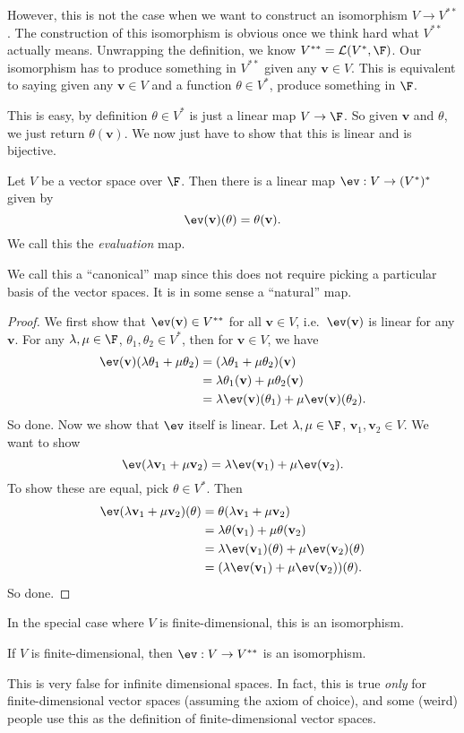 \documentclass[a4paper]{article}
\begin{document}
However, this is not the case when we want to construct an isomorphism $V \to V^{**}$. The construction of this isomorphism is obvious once we think hard what $V^{**}$ actually means. Unwrapping the definition, we know $V^{**} = \mathcal{L}(V^*, \F)$. Our isomorphism has to produce something in $V^{**}$ given any $\mathbf{v} \in V$. This is equivalent to saying given any $\mathbf{v} \in V$ and a function $\theta \in V^*$, produce something in $\F$.

This is easy, by definition $\theta \in V^*$ is just a linear map $V \to \F$. So given $\mathbf{v}$ and $\theta$, we just return $\theta(\mathbf{v})$. We now just have to show that this is linear and is bijective.
\begin{lemma}
  Let $V$ be a vector space over $\F$. Then there is a linear map $\ev: V\to (V^*)^*$ given by
  \[
    \ev (\mathbf{v})(\theta) = \theta(\mathbf{v}).
  \]
  We call this the \emph{evaluation} map.
\end{lemma}
We call this a ``canonical'' map since this does not require picking a particular basis of the vector spaces. It is in some sense a ``natural'' map.

\begin{proof}
  We first show that $\ev(\mathbf{v}) \in V^{**}$ for all $\mathbf{v}\in V$, i.e.\ $\ev (\mathbf{v})$ is linear for any $\mathbf{v}$. For any $\lambda, \mu\in \F$, $\theta_1, \theta_2 \in V^*$, then for $\mathbf{v} \in V$, we have
  \begin{align*}
    \ev(\mathbf{v})(\lambda\theta_1 + \mu\theta_2) &= (\lambda\theta_1 + \mu\theta_2)(\mathbf{v}) \\
    &= \lambda\theta_1(\mathbf{v}) + \mu\theta_2(\mathbf{v}) \\
    &= \lambda\ev(\mathbf{v})(\theta_1) + \mu \ev(\mathbf{v})(\theta_2).
  \end{align*}
  So done. Now we show that $\ev$ itself is linear. Let $\lambda, \mu\in \F$, $\mathbf{v}_1, \mathbf{v}_2 \in V$. We want to show
  \[
    \ev(\lambda\mathbf{v}_1 + \mu \mathbf{v}_2) = \lambda \ev (\mathbf{v}_1) + \mu \ev(\mathbf{v}_2).
  \]
  To show these are equal, pick $\theta \in V^*$. Then
  \begin{align*}
    \ev(\lambda \mathbf{v}_1 + \mu \mathbf{v}_2)(\theta) &= \theta(\lambda\mathbf{v}_1 + \mu \mathbf{v}_2) \\
    &= \lambda\theta(\mathbf{v}_1) + \mu \theta(\mathbf{v}_2) \\
    &= \lambda \ev(\mathbf{v}_1)(\theta) + \mu \ev(\mathbf{v}_2)(\theta) \\
    &= (\lambda \ev(\mathbf{v}_1) + \mu \ev(\mathbf{v}_2))(\theta).
  \end{align*}
  So done.
\end{proof}
In the special case where $V$ is finite-dimensional, this is an isomorphism.
\begin{lemma}
  If $V$ is finite-dimensional, then $\ev: V \to V^{**}$ is an isomorphism.
\end{lemma}
This is very false for infinite dimensional spaces. In fact, this is true \emph{only} for finite-dimensional vector spaces (assuming the axiom of choice), and some (weird) people use this as the definition of finite-dimensional vector spaces.
\end{document}
